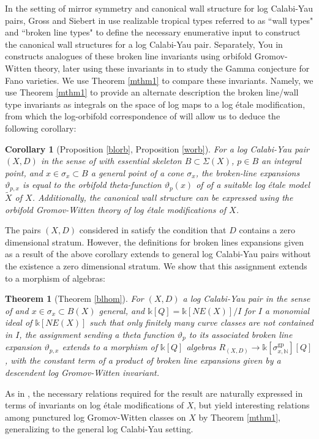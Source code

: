 \documentclass[12pt, oneside]{amsart}   	%
\newcounter{thm}
\newtheorem{theorem}[thm]{Theorem}
\newtheorem{corollary}[thm]{Corollary}
\newcommand{\NN}{\mathbb{N}}
\newcommand{\kk}{\mathds{k}}
\newcommand{\gp}{\operatorname{gp}}
\numberwithin{equation}{section}
\numberwithin{thm}{section}
\numberwithin{figure}{section}
\begin{document}
In the setting of mirror symmetry and canonical wall structure for log Calabi-Yau pairs, Gross and Siebert in \cite{scatt} use realizable tropical types referred to as ``wall types" and ``broken line types" to define the necessary enumerative input to construct the canonical wall structures for a log Calabi-Yau pair. Separately, You in \cite{orbBL} constructs analogues of these broken line invariants using orbifold Gromov-Witten theory, later using these invariants in \cite{yougamma} to study the Gamma conjecture for Fano varieties. We use Theorem \ref{mthm1} to compare these invariants. Namely, we use Theorem \ref{mthm1} to provide an alternate description the broken line/wall type invariants as integrals on the space of log maps to a log \'etale modification, from which the log-orbifold correspondence of \cite{BNR2} will allow us to deduce the following corollary:


\begin{corollary}[Proposition \ref{blorb}, Proposition \ref{worb}]
For a log Calabi-Yau pair $(X,D)$ in the sense of \cite{scatt} with essential skeleton $B \subset \Sigma(X)$, $p \in B$ an integral point, and $x \in \sigma_x \subset B$ a general point of a cone $\sigma_x$, the broken-line expansions $\vartheta_{p,x}$ is equal to the orbifold theta-function $\vartheta_{p}(x)$ of \cite{orbBL} of a suitable log \'etale model $\widetilde{X}$ of $X$. Additionally, the canonical wall structure can be expressed using the orbifold Gromov-Witten theory of log \'etale modifications of $X$. 
\end{corollary}


The pairs $(X,D)$ considered in \cite{scatt} satisfy the condition that $D$ contains a zero dimensional stratum. However, the definitions for broken lines expansions given as a result of the above corollary extends to general log Calabi-Yau pairs without the existence a zero dimensional stratum. We show that this assignment extends to a morphism of algebras:

\begin{theorem}[Theorem \ref{blhom}]
For $(X,D)$ a log Calabi-Yau pair in the sense of \cite{int_mirror} and $x \in \sigma_x \subset B(X)$ general, and $\kk[Q] = \kk[NE(X)]/I$ for $I$ a monomial ideal of $\kk[NE(X)]$ such that only finitely many curve classes are not contained in $I$, the assignment sending a theta function $\vartheta_p$ to its associated broken line expansion $\vartheta_{p,x}$ extends to a morphism of $\kk[Q]$ algebras $R_{(X,D)} \rightarrow \kk[\sigma_{x,\NN}^{\gp}][Q]$, with the constant term of a product of broken line expansions given by a descendent log Gromov-Witten invariant.
\end{theorem} 
As in \cite{logWDVV}, the necessary relations required for the result are naturally expressed in terms of invariants on log \'etale modifications of $X$, but yield interesting relations among punctured log Gromov-Witten classes on $X$ by Theorem \ref{mthm1}, generalizing \cite[Theorem $6.1$]{scatt} to the general log Calabi-Yau setting. 
\end{document}
